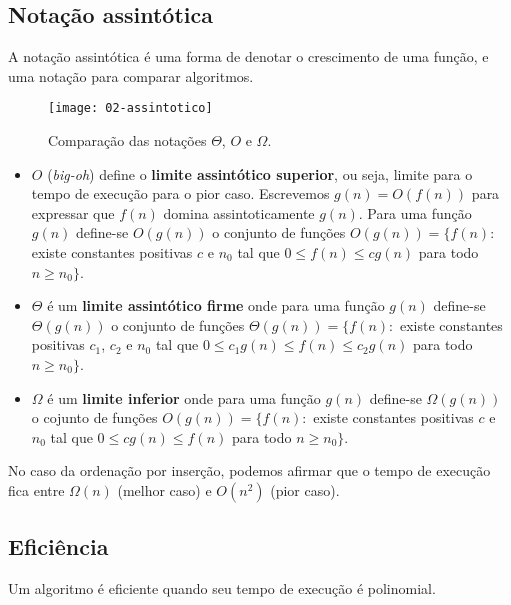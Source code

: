 \subsection{Notação assintótica}

A notação assintótica é uma forma de denotar o crescimento de uma função,
e uma notação para comparar algoritmos.
%
\begin{figure}[ht]
\centering
\texttt{[image: 02-assintotico]}
\caption{Comparação das notações $\Theta$, $O$ e $\Omega$.}
\label{aula02:fig:assintotico}
\end{figure}

\begin{itemize}
\item $O$ (\emph{big-oh}) define o {\bf limite assintótico superior}, ou seja, 
limite para o tempo de execução para o pior caso. Escrevemos $g(n) = O(f(n))$ para
expressar que $f(n)$ domina assintoticamente $g(n)$. Para
uma função $g(n)$ define-se $O(g(n))$ o conjunto de funções 
$O(g(n)) = \{f(n):$ existe constantes positivas $c$ e $n_0$ tal que $0 \leq f(n) \leq c g(n)$ 
para todo $n \geq n_0\}$.

\item $\Theta$ é um {\bf limite assintótico firme} onde 
para uma função $g(n)$ define-se $\Theta(g(n))$ o conjunto de funções 
$\Theta(g(n)) = \{f(n):$ existe constantes positivas $c_1$, $c_2$ e $n_0$ tal que 
$0 \leq c_1 g(n) \leq f(n) \leq c_2 g(n)$ 
para todo $n \geq n_0\}$.

\item $\Omega$ é um {\bf limite inferior} onde para uma função $g(n)$ 
define-se $\Omega(g(n))$ o cojunto de funções
$O(g(n)) = \{f(n):$ existe constantes positivas $c$ e $n_0$ tal que $0 \leq c g(n) \leq f(n)$ 
para todo $n \geq n_0\}$.

\end{itemize}

No caso da ordenação por inserção, podemos afirmar que o tempo de execução fica entre
$\Omega(n)$ (melhor caso) e $O(n^2)$ (pior caso).

\subsection{Eficiência}

\begin{framed}
\centering
Um algoritmo é eficiente quando seu tempo de execução é polinomial.
\end{framed}

